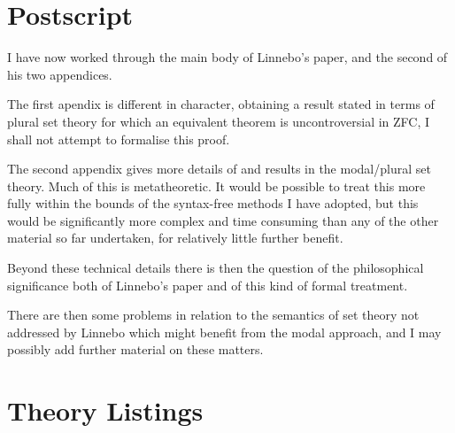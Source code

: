 
\section{Postscript}\label{POSTSCRIPT}

I have now worked through the main body of Linnebo's paper, and the second of his two appendices.

The first apendix is different in character, obtaining a result stated in terms of plural set theory for which an equivalent theorem is uncontroversial in ZFC, I shall not attempt to formalise this proof.

The second appendix gives more details of and results in the modal/plural set theory.
Much of this is metatheoretic.
It would be possible to treat this more fully within the bounds of the syntax-free methods I have adopted, but this would be significantly more complex and time consuming than any of the other material so far undertaken, for relatively little further benefit.

Beyond these technical details there is then the question of the philosophical significance both of Linnebo's paper and of this kind of formal treatment.

There are then some problems in relation to the semantics of set theory not addressed by Linnebo which might benefit from the modal approach, and I may possibly add further material on these matters.

\pagebreak

\appendix

\section{Theory Listings}

{
\let\Section\subsection
\let\Subsection\subsubsection
\def\subsection#1{\Subsection*{#1}}

\def\section#1{\Section{#1}\label{t046a}\index{t046a}}

\pagebreak
\def\section#1{\Section{#1}\label{t046b}\index{t046b}}

}  %

